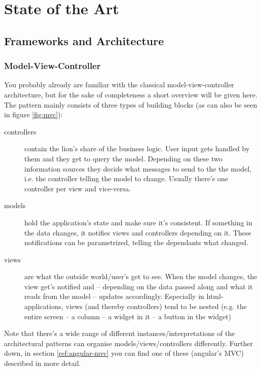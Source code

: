 
\chapter{State of the Art}

\section{Frameworks and Architecture}

\subsection{Model-View-Controller}\label{ref:mvc}

You probably already are familiar with the classical model-view-controller architecture, but for the sake of completeness a short overview will be given here. The pattern mainly consists of three types of building blocks (as can also be seen in figure \ref{fig:mvc}): 

\begin{description}
  \item[controllers] contain the lion's share of the business logic. User input gets handled by them and they get to query the model. Depending on these two information sources they decide what messages to send to the the model, i.e. the controller telling the model to change. Usually there's one controller per view and vice-versa.
  \item[models] hold the application's state and make sure it's consistent. If something in the data changes, it notifies views and controllers depending on it. These notifications can be parametrized, telling the dependants what changed.
  \item[views] are what the outside world/user's get to see. When the model changes, the view get's notified and -- depending on the data passed along and what it reads from the model --  updates accordingly.
  Especially in html-applications, views (and thereby controllers) tend to be nested (e.g. the entire screen -- a column -- a widget in it -- a button in the widget)
\end{description}

Note that there's a wide range of different instances/interpretations of the architectural patterns can organise models/views/controllers differently. Further down, in section \ref{ref:angular-mvc} you can find one of these (angular's MVC) described in more detail.

